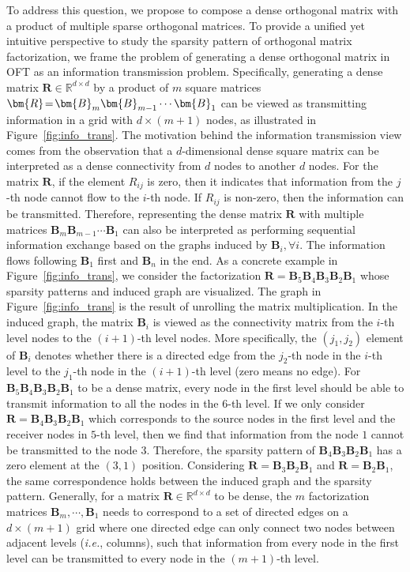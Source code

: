 To address this question, we propose to compose a dense orthogonal matrix with a product of multiple sparse orthogonal matrices. To provide a unified yet intuitive perspective to study the sparsity pattern of orthogonal matrix factorization, we frame the problem of generating a dense orthogonal matrix in OFT as an information transmission problem. Specifically, generating a dense matrix $\bm{R}\in\mathbb{R}^{d\times d}$ by a product of $m$ square matrices $\thickmuskip=2mu \medmuskip=2mu \bm{R}=\bm{B}_m\bm{B}_{m-1}\cdots\bm{B}_1$ can be viewed as transmitting information in a grid with $d\times (m+1)$ nodes, as illustrated in Figure~\ref{fig:info_trans}. The motivation behind the information transmission view comes from the observation that a $d$-dimensional dense square matrix can be interpreted as a dense connectivity from $d$ nodes to another $d$ nodes. For the matrix $\bm{R}$, if the element $R_{ij}$ is zero, then it indicates that information from the $j$-th node cannot flow to the $i$-th node. If $R_{ij}$ is non-zero, then the information can be transmitted. Therefore, representing the dense matrix $\bm{R}$ with multiple matrices $\bm{B}_m\bm{B}_{m-1}\cdots\bm{B}_1$ can also be interpreted as performing sequential information exchange based on the graphs induced by $\bm{B}_i, \forall i$. The information flows following $\bm{B}_1$ first and $\bm{B}_n$ in the end. As a concrete example in Figure~\ref{fig:info_trans}, we consider the factorization $\bm{R}=\bm{B}_5\bm{B}_4\bm{B}_3\bm{B}_2\bm{B}_1$ whose sparsity patterns and induced graph are visualized. The graph in Figure~\ref{fig:info_trans} is the result of unrolling the matrix multiplication. In the induced graph, the matrix $\bm{B}_i$ is viewed as the connectivity matrix from the $i$-th level nodes to the $(i+1)$-th level nodes. More specifically, the $(j_1,j_2)$ element of $\bm{B}_i$ denotes whether there is a directed edge from the $j_2$-th node in the $i$-th level to the $j_1$-th node in the $(i+1)$-th level (zero means no edge). For $\bm{B}_5\bm{B}_4\bm{B}_3\bm{B}_2\bm{B}_1$ to be a dense matrix, every node in the first level should be able to transmit information to all the nodes in the $6$-th level. If we only consider $\bm{R}=\bm{B}_4\bm{B}_3\bm{B}_2\bm{B}_1$ which corresponds to the source nodes in the first level and the receiver nodes in $5$-th level, then we find that information from the node $1$ cannot be transmitted to the node $3$. Therefore, the sparsity pattern of $\bm{B}_4\bm{B}_3\bm{B}_2\bm{B}_1$ has a zero element at the $(3,1)$ position. Considering $\bm{R}=\bm{B}_3\bm{B}_2\bm{B}_1$ and $\bm{R}=\bm{B}_2\bm{B}_1$, the same correspondence holds between the induced graph and the sparsity pattern. Generally, for a matrix $\bm{R}\in\mathbb{R}^{d\times d}$ to be dense, the $m$ factorization matrices $\bm{B}_m,\cdots,\bm{B}_1$ needs to correspond to a set of directed edges on a $d\times (m+1)$ grid where one directed edge can only connect two nodes between adjacent levels (\emph{i.e.}, columns), such that information from every node in the first level can be transmitted to every node in the $(m+1)$-th level.

